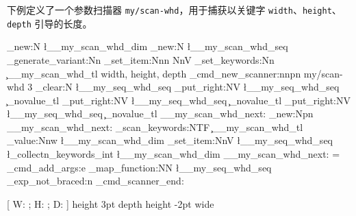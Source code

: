 \documentclass[openany]{book}
\begin{document}
下例定义了一个参数扫描器 \texttt{my/scan-whd}，用于捕获以关键字 
\texttt{width}、\texttt{height}、\texttt{depth} 引导的长度。

\begin{examcode}{}
\ExplSyntaxOn
\dim_new:N \l__my_scan_whd_dim %
\seq_new:N \l__my_scan_whd_seq %
\cs_generate_variant:Nn \seq_set_item:Nnn { NnV }
\collectn_set_keywords:Nn \c__my_scan_whd_tl { width, height, depth }
\ekeys_cmd_new_scanner:nnpn { my/scan-whd } { 3 }
  {
    \seq_clear:N \l__my_seq_whd_seq
    \seq_put_right:NV \l__my_seq_whd_seq \c_novalue_tl
    \seq_put_right:NV \l__my_seq_whd_seq \c_novalue_tl
    \seq_put_right:NV \l__my_seq_whd_seq \c_novalue_tl
    \__my_scan_whd_next: 
  }
\cs_new:Npn \__my_scan_whd_next: 
  {
    \collectn_scan_keywords:NTF \c__my_scan_whd_tl 
      {
        \collectn_value:Nnw \l__my_scan_whd_dim 
          {
            \seq_set_item:NnV \l__my_seq_whd_seq 
              { \l_collectn_keywords_int } \l__my_scan_whd_dim 
            \__my_scan_whd_next: 
          } = %
      }
      { 
        \ekeys_cmd_add_args:e
          { \seq_map_function:NN \l__my_seq_whd_seq \ekeys_exp_not_braced:n }
        \ekeys_cmd_scanner_end: 
      }
  }
\ExplSyntaxOff

\DeclareEKeysCommand {} 
  {[ W: ; H: ; D:  ]}
\ttfamily
\foo height 3pt depth \dimeval{3pt+2pt-10pt} height \dimexpr 3pt-2pt wide
\end{examcode}
\end{document}
